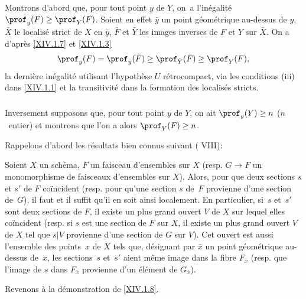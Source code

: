 \subsubsection{} \label{XIV.1.8.1} Montrons d'abord que, pour tout point $y$ de $Y$, on~a l'in\'egalit\'e $\prof_y(F)\geq \prof_Y(F)$. Soient en effet $\bar y$ un point g\'eom\'etrique au-dessus de $y$, $\bar X$ le localis\'e strict de $X$ en $\bar y$, $\bar F$ et $\bar Y$ les images inverses de $F$ et $Y$ sur $\bar X$. On a d'apr\`es \ref{XIV.1.7} et \ref{XIV.1.3}
$$
\prof_y(F)=\prof_{\bar y}(\bar F)\geq \prof_{\bar Y}(\bar F)\geq \prof_Y(F),
$$
la derni\`ere in\'egalit\'e utilisant l'hypoth\`ese \og $U$ r\'etrocompact\fg, via les conditions \textup{(iii)} dans \ref{XIV.1.1} et la transitivit\'e dans la formation des localis\'es stricts.

\subsubsection{} \label{XIV.1.8.2}
Inversement supposons que, pour tout point $y$ de $Y$, on ait $\prof_y(Y)\geq n$ ($n$~entier) et montrons que l'on a alors $\prof_Y(F)\geq n$.

Rappelons d'abord les r\'esultats bien connus suivant \textup{( VIII)}:

\begin{subsublemme} \label{XIV.1.8.2.1}
Soient $X$ un sch\'ema, $F$ un faisceau d'ensembles sur $X$ (resp. $G\to F$ un monomorphisme de faisceaux d'ensembles sur $X$). Alors, pour que deux sections $s$ et $s'$ de $F$ co\"incident (resp. pour qu'une section $s$ de~$F$ provienne d'une section de~$G$), il faut et il suffit qu'il en soit ainsi localement. En particulier, si~$s$ et~$s'$ sont deux sections de $F$, il existe un plus grand ouvert $V$ de $X$ sur lequel elles co\"incident (resp. si $s$ est une section de $F$ sur $X$, il existe un plus grand ouvert $V$ de $X$ tel que $s|V$ provienne d'une section de $G$ sur $V$). Cet ouvert est aussi l'ensemble des points~$x$ de $X$ tels que, d\'esignant par $\bar x$ un point g\'eom\'etrique au-dessus de~$x$, les sections~$s$ et~$s'$ aient m\^eme image dans la fibre $F_{\bar x}$ (resp. que l'image de $s$ dans $F_{\bar x}$ provienne d'un \'el\'ement de $G_{\bar x}$).
\end{subsublemme}

Revenons \`a la d\'emonstration de \ref{XIV.1.8}.

